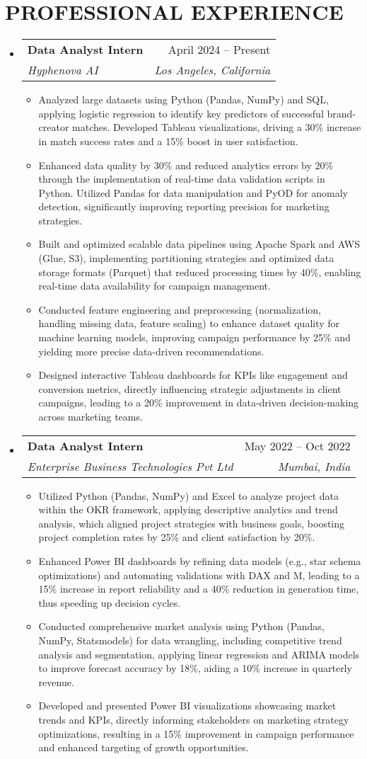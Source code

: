 \documentclass[letterpaper,11pt]{article}
\makeatletter
\newcommand{\resumeItem}[1]{
  \item\small{
    {#1 \vspace{-4pt}}
  }
}
\newcommand{\resumeSubheading}[4]{
  \vspace{-2pt}\item
    \begin{tabular*}{0.97\textwidth}[t]{l@{\extracolsep{\fill}}r}
      \textbf{#1} & #2 \\
      \textit{\small#3} & \textit{\small #4} \\
    \end{tabular*}\vspace{-7pt}
}
\newcommand{\resumeSubHeadingListStart}{\begin{itemize}[leftmargin=0.15in, label={}]}
\newcommand{\resumeSubHeadingListEnd}{\end{itemize}}
\newcommand{\resumeItemListStart}{\begin{itemize}}
\newcommand{\resumeItemListEnd}{\end{itemize}\vspace{-5pt}}
\makeatother
\begin{document}
\section{\textbf{PROFESSIONAL EXPERIENCE}}
  \resumeSubHeadingListStart
    \resumeSubheading
      {Data Analyst Intern}{April 2024 -- Present}
      {Hyphenova AI}{Los Angeles, California}
      \resumeItemListStart
        \resumeItem{Analyzed large datasets using Python (Pandas, NumPy) and SQL, applying logistic regression to identify key predictors of successful brand-creator matches. Developed Tableau visualizations, driving a 30\% increase in match success rates and a 15\% boost in user satisfaction.}
        \resumeItem{Enhanced data quality by 30\% and reduced analytics errors by 20\% through the implementation of real-time data validation scripts in Python. Utilized Pandas for data manipulation and PyOD for anomaly detection, significantly improving reporting precision for marketing strategies.}
        \resumeItem{Built and optimized scalable data pipelines using Apache Spark and AWS (Glue, S3), implementing partitioning strategies and optimized data storage formats (Parquet) that reduced processing times by 40\%, enabling real-time data availability for campaign management.}
        \resumeItem{Conducted feature engineering and preprocessing (normalization, handling missing data, feature scaling) to enhance dataset quality for machine learning models, improving campaign performance by 25\% and yielding more precise data-driven recommendations.}
        \resumeItem{Designed interactive Tableau dashboards for KPIs like engagement and conversion metrics, directly influencing strategic adjustments in client campaigns, leading to a 20\% improvement in data-driven decision-making across marketing teams.}
      \resumeItemListEnd

    \resumeSubheading
      {Data Analyst Intern}{May 2022 -- Oct 2022}
      {Enterprise Business Technologies Pvt Ltd}{Mumbai, India}
      \resumeItemListStart
        \resumeItem{Utilized Python (Pandas, NumPy) and Excel to analyze project data within the OKR framework, applying descriptive analytics and trend analysis, which aligned project strategies with business goals, boosting project completion rates by 25\% and client satisfaction by 20\%.}
        \resumeItem{Enhanced Power BI dashboards by refining data models (e.g., star schema optimizations) and automating validations with DAX and M, leading to a 15\% increase in report reliability and a 40\% reduction in generation time, thus speeding up decision cycles.}
        \resumeItem{Conducted comprehensive market analysis using Python (Pandas, NumPy, Statsmodels) for data wrangling, including competitive trend analysis and segmentation, applying linear regression and ARIMA models to improve forecast accuracy by 18\%, aiding a 10\% increase in quarterly revenue.}
        \resumeItem{Developed and presented Power BI visualizations showcasing market trends and KPIs, directly informing stakeholders on marketing strategy optimizations, resulting in a 15\% improvement in campaign performance and enhanced targeting of growth opportunities.}
      \resumeItemListEnd
  \resumeSubHeadingListEnd
\end{document}
